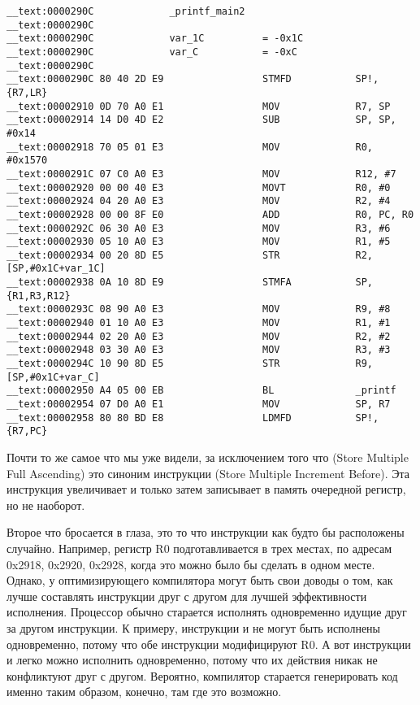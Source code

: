 \begin{lstlisting}
__text:0000290C             _printf_main2
__text:0000290C
__text:0000290C             var_1C          = -0x1C
__text:0000290C             var_C           = -0xC
__text:0000290C
__text:0000290C 80 40 2D E9                 STMFD           SP!, {R7,LR}
__text:00002910 0D 70 A0 E1                 MOV             R7, SP
__text:00002914 14 D0 4D E2                 SUB             SP, SP, #0x14
__text:00002918 70 05 01 E3                 MOV             R0, #0x1570
__text:0000291C 07 C0 A0 E3                 MOV             R12, #7
__text:00002920 00 00 40 E3                 MOVT            R0, #0
__text:00002924 04 20 A0 E3                 MOV             R2, #4
__text:00002928 00 00 8F E0                 ADD             R0, PC, R0
__text:0000292C 06 30 A0 E3                 MOV             R3, #6
__text:00002930 05 10 A0 E3                 MOV             R1, #5
__text:00002934 00 20 8D E5                 STR             R2, [SP,#0x1C+var_1C]
__text:00002938 0A 10 8D E9                 STMFA           SP, {R1,R3,R12}
__text:0000293C 08 90 A0 E3                 MOV             R9, #8
__text:00002940 01 10 A0 E3                 MOV             R1, #1
__text:00002944 02 20 A0 E3                 MOV             R2, #2
__text:00002948 03 30 A0 E3                 MOV             R3, #3
__text:0000294C 10 90 8D E5                 STR             R9, [SP,#0x1C+var_C]
__text:00002950 A4 05 00 EB                 BL              _printf
__text:00002954 07 D0 A0 E1                 MOV             SP, R7
__text:00002958 80 80 BD E8                 LDMFD           SP!, {R7,PC}
\end{lstlisting}

Почти то же самое что мы уже видели, за исключением того что  (Store Multiple Full Ascending) это синоним
инструкции  (Store Multiple Increment Before). 
Эта инструкция увеличивает \SP и только затем записывает в память очередной регистр, но не наоборот.

Второе что бросается в глаза, это то что инструкции как будто бы расположены случайно. Например, регистр R0
подготавливается в трех местах, по адресам 0x2918, 0x2920, 0x2928, когда это можно было бы сделать в одном месте.
Однако, у оптимизирующего компилятора могут быть свои доводы о том, как лучше составлять инструкции друг с другом
для лучшей эффективности исполнения.
Процессор обычно старается исполнять одновременно идущие друг за другом инструкции.
К примеру, инструкции  и  не могут быть исполнены одновременно,
потому что обе инструкции модифицируют R0. 
А вот инструкции  и  легко можно исполнить одновременно, 
потому что их действия никак не конфликтуют друг с другом. 
Вероятно, компилятор старается генерировать код именно таким образом, конечно, там где это возможно.
 
